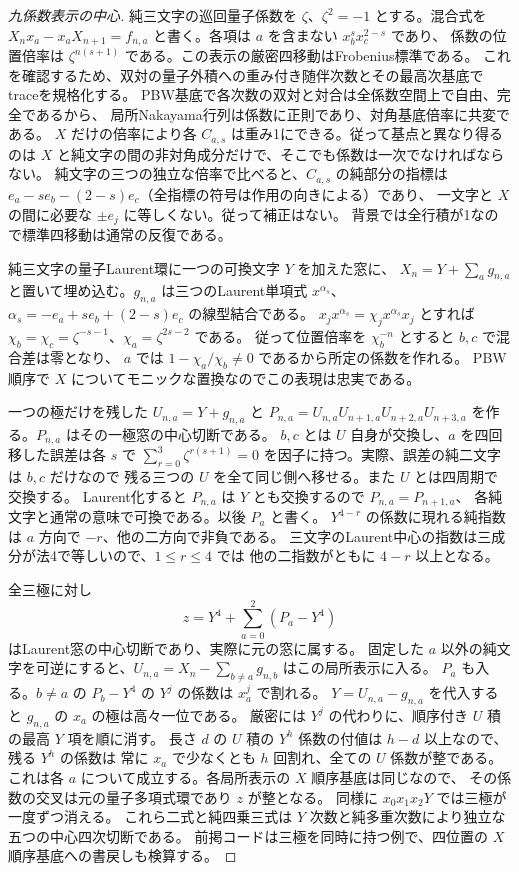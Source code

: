 \begin{proof}[九係数表示の中心]
純三文字の巡回量子係数を $\zeta$、$\zeta^2=-1$ とする。混合式を
$X_n x_a-x_a X_{n+1}=f_{n,a}$ と書く。各項は $a$ を含まない $x_b^s x_c^{2-s}$ であり、
係数の位置倍率は $\zeta^{n(s+1)}$ である。この表示の厳密四移動はFrobenius標準である。
これを確認するため、双対の量子外積への重み付き随伴次数とその最高次基底でtraceを規格化する。
PBW基底で各次数の双対と対合は全係数空間上で自由、完全であるから、
局所Nakayama行列は係数に正則であり、対角基底倍率に共変である。
$X$ だけの倍率により各 $C_{a,s}$ は重み1にできる。従って基点と異なり得るのは
$X$ と純文字の間の非対角成分だけで、そこでも係数は一次でなければならない。
純文字の三つの独立な倍率で比べると、$C_{a,s}$ の純部分の指標は
$e_a-se_b-(2-s)e_c$（全指標の符号は作用の向きによる）であり、
一文字と $X$ の間に必要な $\pm e_j$ に等しくない。従って補正はない。
背景では全行積が1なので標準四移動は通常の反復である。

純三文字の量子Laurent環に一つの可換文字 $Y$ を加えた窓に、
$X_n=Y+\sum_a g_{n,a}$ と置いて埋め込む。$g_{n,a}$ は三つのLaurent単項式
$x^{\alpha_s}$、$\alpha_s=-e_a+s e_b+(2-s)e_c$ の線型結合である。
$x_j x^{\alpha_s}=\chi_j x^{\alpha_s}x_j$ とすれば
$\chi_b=\chi_c=\zeta^{-s-1}$、$\chi_a=\zeta^{2s-2}$ である。
従って位置倍率を $\chi_b^{-n}$ とすると $b,c$ で混合差は零となり、
$a$ では $1-\chi_a/\chi_b\ne0$ であるから所定の係数を作れる。
PBW順序で $X$ についてモニックな置換なのでこの表現は忠実である。

一つの極だけを残した $U_{n,a}=Y+g_{n,a}$ と
$P_{n,a}=U_{n,a}U_{n+1,a}U_{n+2,a}U_{n+3,a}$ を作る。$P_{n,a}$ はその一極窓の中心切断である。
$b,c$ とは $U$ 自身が交換し、$a$ を四回移した誤差は各 $s$ で
$\sum_{r=0}^3\zeta^{r(s+1)}=0$ を因子に持つ。実際、誤差の純二文字は $b,c$ だけなので
残る三つの $U$ を全て同じ側へ移せる。また $U$ とは四周期で交換する。
Laurent化すると $P_{n,a}$ は $Y$ とも交換するので $P_{n,a}=P_{n+1,a}$、
各純文字と通常の意味で可換である。以後 $P_a$ と書く。
$Y^{4-r}$ の係数に現れる純指数は $a$ 方向で $-r$、他の二方向で非負である。
三文字のLaurent中心の指数は三成分が法4で等しいので、$1\le r\le4$ では
他の二指数がともに $4-r$ 以上となる。

全三極に対し
\[
             z=Y^4+\sum_{a=0}^2(P_a-Y^4)
\]
はLaurent窓の中心切断であり、実際に元の窓に属する。
固定した $a$ 以外の純文字を可逆にすると、$U_{n,a}=X_n-\sum_{b\ne a}g_{n,b}$ はこの局所表示に入る。
$P_a$ も入る。$b\ne a$ の $P_b-Y^4$ の $Y^j$ の係数は $x_a^j$ で割れる。
$Y=U_{n,a}-g_{n,a}$ を代入すると $g_{n,a}$ の $x_a$ の極は高々一位である。
厳密には $Y^j$ の代わりに、順序付き $U$ 積の最高 $Y$ 項を順に消す。
長さ $d$ の $U$ 積の $Y^h$ 係数の付値は $h-d$ 以上なので、残る $Y^h$ の係数は
常に $x_a$ で少なくとも $h$ 回割れ、全ての $U$ 係数が整である。
これは各 $a$ について成立する。各局所表示の $X$ 順序基底は同じなので、
その係数の交叉は元の量子多項式環であり $z$ が整となる。
同様に $x_0x_1x_2Y$ では三極が一度ずつ消える。
これら二式と純四乗三式は $Y$ 次数と純多重次数により独立な五つの中心四次切断である。
前掲コードは三極を同時に持つ例で、四位置の $X$ 順序基底への書戻しも検算する。
\end{proof}


